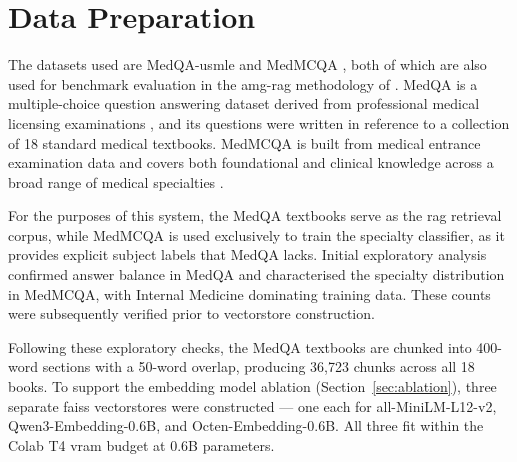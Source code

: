 \section{Data Preparation}
\label{sec:data}

The datasets used are MedQA-\gls{usmle} \cite{jin_what_2021} and MedMCQA \cite{pal_medmcqa_2022}, both of which are also used for benchmark evaluation in the \gls{amg-rag} methodology of \citet{rezaei_agentic_2025}. MedQA is a multiple-choice question answering dataset derived from professional medical licensing examinations \cite{jin_what_2021}, and its questions were written in reference to a collection of 18 standard medical textbooks. MedMCQA is built from medical entrance examination data and covers both foundational and clinical knowledge across a broad range of medical specialties \cite{pal_medmcqa_2022}.

For the purposes of this system, the MedQA textbooks serve as the \gls{rag} retrieval corpus, while MedMCQA is used exclusively to train the specialty classifier, as it provides explicit subject labels that MedQA lacks. Initial exploratory analysis confirmed answer balance in MedQA and characterised the specialty distribution in MedMCQA, with Internal Medicine dominating training data. These counts were subsequently verified prior to vectorstore construction.

Following these exploratory checks, the MedQA textbooks are chunked into 400-word sections with a 50-word overlap, producing 36,723 chunks across all 18 books. To support the embedding model ablation (Section~\ref{sec:ablation}), three separate \gls{faiss} vectorstores were constructed --- one each for all-MiniLM-L12-v2, Qwen3-Embedding-0.6B, and Octen-Embedding-0.6B. All three fit within the Colab T4 \gls{vram} budget at 0.6B parameters.
